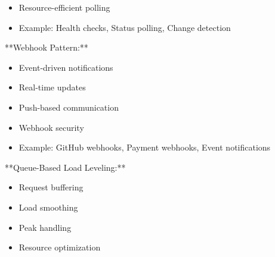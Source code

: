 \documentclass[11pt,a4paper]{article}
\begin{document}
\begin{itemize}
\item Resource-efficient polling
\end{itemize}

\begin{itemize}
\item Example: Health checks, Status polling, Change detection
\end{itemize}

**Webhook Pattern:**

\begin{itemize}
\item Event-driven notifications
\end{itemize}

\begin{itemize}
\item Real-time updates
\end{itemize}

\begin{itemize}
\item Push-based communication
\end{itemize}

\begin{itemize}
\item Webhook security
\end{itemize}

\begin{itemize}
\item Example: GitHub webhooks, Payment webhooks, Event notifications
\end{itemize}

**Queue-Based Load Leveling:**

\begin{itemize}
\item Request buffering
\end{itemize}

\begin{itemize}
\item Load smoothing
\end{itemize}

\begin{itemize}
\item Peak handling
\end{itemize}

\begin{itemize}
\item Resource optimization
\end{itemize}
\end{document}
